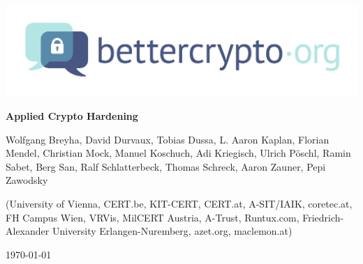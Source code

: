 \begin{titlepage}
  \begin{center}
    \includegraphics[scale=0.5]{img/logo}
    \vspace{45pt}
    \HorRule
    \medskip
    {\fontsize{35}{36} \bfseries Applied Crypto Hardening\par}
    \bigskip
  \end{center}
  \begin{flushleft}
    {\large \color{intersectgreen} Wolfgang Breyha, David Durvaux, Tobias
      Dussa, L. Aaron Kaplan, Florian Mendel, Christian Mock, Manuel Koschuch,
      Adi Kriegisch, Ulrich P\"oschl, Ramin Sabet, Berg San, Ralf
      Schlatterbeck, Thomas Schreck, Aaron Zauner, Pepi Zawodsky
      \par}
    \bigskip
    (University of Vienna, CERT.be, KIT-CERT, CERT.at, A-SIT/IAIK, coretec.at, FH
    Campus Wien, VRVis, MilCERT Austria, A-Trust, Runtux.com,
    Friedrich-Alexander University Erlangen-Nuremberg, azet.org, maclemon.at)
  \end{flushleft}
  \medskip
  \HorRule
  \begin{center}
    \today
  \end{center}
\end{titlepage}
